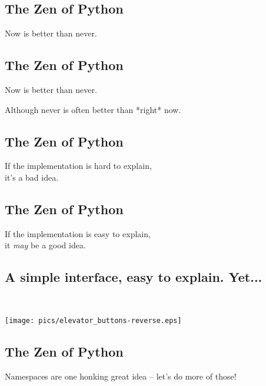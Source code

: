 \documentclass[xga]{xdvislides}
\begin{document}
\subsection{The Zen of Python}
\begin{center}
    Now is better than never.
\end{center}

\subsection{The Zen of Python}
\begin{center}
    Now is better than never.  \\

\addvspace{.5in}

    Although never is often better than *right* now.
\end{center}

\subsection{The Zen of Python}
\begin{center}
    If the implementation is hard to explain, \\
it's a bad idea.
\end{center}

\subsection{The Zen of Python}
\begin{center}
    If the implementation is easy to explain, \\
	it {\em may} be a good idea.
\end{center}

\subsection{A simple interface, easy to explain.  Yet...}
\\
\vspace*{\fill}
\begin{center}
	\texttt{[image: pics/elevator\_buttons-reverse.eps]}
\end{center}
\vspace*{\fill}


\subsection{The Zen of Python}
\begin{center}
    Namespaces are one honking great idea -- let's do more of those!
\end{center}
\Normalsize
\end{document}

